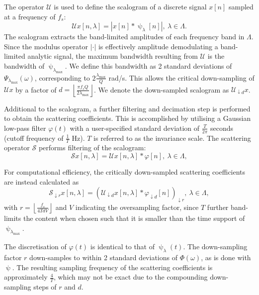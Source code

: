 {The operator $\mathcal{U}$ is used to define the scalogram of a discrete signal $x[n]$ sampled at a frequency of $f_s$:
\begin{equation}
    \mathcal{U}x[n, \lambda] = \left|x[n] * \uppsi_\lambda[n]\right|,\  \lambda \in \Lambda.
\end{equation}
The scalogram extracts the band-limited amplitudes of each frequency band in $\Lambda$. Since the modulus operator $|\cdot|$ is effectively amplitude demodulating a band-limited analytic signal, the maximum bandwidth resulting from $\mathcal{U}$ is the bandwidth of $\uppsi_{\lambda_\text{max}}$. We define this bandwidth as 2 standard deviations of $\Psi_{\lambda_\text{max}}(\omega)$, corresponding to $2\frac{\lambda_\text{max}}{Q}$ rad/s. This allows the critical down-sampling of $\mathcal{U}x$ by a factor of $d = \left\lfloor\frac{\pi f_s Q}{2\lambda_\text{max}}\right\rfloor$. We denote the down-sampled scalogram as $\mathcal{U}_{\downarrow d}x$.  %

Additional to the scalogram, a further filtering and decimation step is performed to obtain the scattering coefficients. This is accomplished by utilising a Gaussian low-pass filter $\varphi(t)$ with a user-specified standard deviation of $\frac{T}{2\pi}$ seconds (cutoff frequency of $\frac{1}{T}$ Hz). $T$ is referred to as the invariance scale. The scattering operator $\mathcal{S}$ performs filtering of the scalogram:
\begin{equation}
    \mathcal{S}x[n, \lambda] = \mathcal{U}x[n, \lambda] * \varphi[n], \ \lambda \in \Lambda,
\end{equation}

For computational efficiency, the critically down-sampled scattering coefficients are instead calculated as
\begin{equation}
\label{eqn:scattering:downsample}
    \mathcal{S}_{\downarrow r}x[n, \lambda] = \left(\mathcal{U}_{\downarrow d}x[n, \lambda] * \varphi_{\downarrow d}[n]\right)_{\downarrow r}, \ \lambda \in \Lambda,
\end{equation}
with $r = \left\lfloor\frac{f_s}{ 4 T d V}\right\rfloor$ and $V$ indicating the oversampling factor, since $T$ further band-limits the content when chosen such that it is smaller than the time support of $\uppsi_{\lambda_\text{max}}$.

The discretisation of $\varphi(t)$ is identical to that of $\uppsi_\lambda(t)$. The down-sampling factor $r$ down-samples to within 2 standard deviations of $\Phi(\omega)$, as is done with $\uppsi$. The resulting sampling frequency of the scattering coefficients is approximately $\frac{4}{T}$, which may not be exact due to the compounding down-sampling steps of $r$ and $d$.

}
